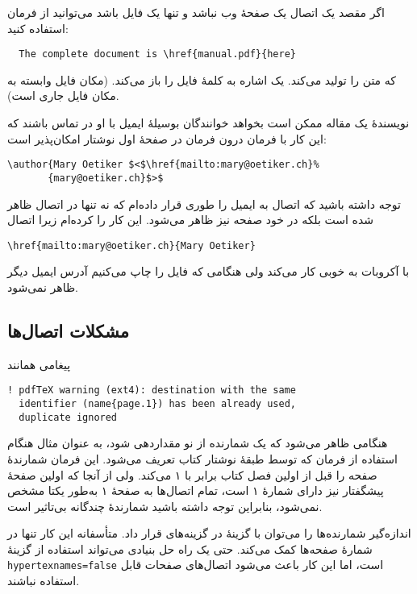 اگر مقصد یک اتصال یک صفحهٔ وب نباشد و تنها یک فایل باشد می‌توانید از فرمان   استفاده کنید: 

\setLR
\begin{verbatim}
  The complete document is \href{manual.pdf}{here}
\end{verbatim}
\setRL

که متن 
 را تولید می‌کند.
یک اشاره به کلمهٔ 
  فایل   را باز می‌کند. 
(مکان فایل وابسته به مکان فایل جاری است).

نویسندهٔ یک مقاله ممکن است بخواهد خوانندگان بوسیلهٔ ایمیل با او در تماس باشند که این کار با فرمان  درون فرمان  در صفحهٔ اول نوشتار‌ امکان‌پذیر است:

\setLR
\begin{code}
\begin{verbatim}
\author{Mary Oetiker $<$\href{mailto:mary@oetiker.ch}%
       {mary@oetiker.ch}$>$
\end{verbatim}
\end{code}
\setRL

توجه داشته باشید که اتصال به ایمیل را طوری قرار داده‌ام که نه تنها در اتصال ظاهر شده است بلکه در خود صفحه نیز ظاهر می‌شود. این کار را کرده‌ام زیرا اتصال

\setLR
\verb+\href{mailto:mary@oetiker.ch}{Mary Oetiker}+\\
\setRL

با آکروبات به خوبی کار می‌کند ولی هنگامی که فایل را چاپ می‌کنیم آدرس ایمیل دیگر ظاهر نمی‌شود.

\subsection{مشکلات اتصال‌ها}
پیغامی همانند 

\setLR
\begin{verbatim}
! pdfTeX warning (ext4): destination with the same
  identifier (name{page.1}) has been already used,
  duplicate ignored
\end{verbatim}
\setRL

هنگامی ظاهر می‌شود که یک شمارنده از نو مقداردهی شود، به عنوان مثال هنگام استفاده از فرمان   که توسط طبقهٔ نوشتار کتاب تعریف می‌شود. این فرمان شمارندهٔ صفحه را قبل از اولین فصل کتاب برابر با ۱ می‌کند. ولی از آنجا که اولین صفحهٔ پیشگفتار نیز دارای شمارهٔ ۱ است، تمام اتصال‌ها به صفحهٔ ۱ به‌طور یکتا مشخص نمی‌شود،   بنابراین توجه داشته باشید شمارندهٔ چندگانه بی‌تاثیر است.

اندازه‌گیر شمارنده‌ها را می‌توان با گزینهٔ  در گزینه‌های  قرار داد. متأسفانه این کار تنها در شمارهٔ صفحه‌ها کمک می‌کند.
حتی یک راه حل بنیادی می‌تواند استفاده از گزینهٔ \texttt{hypertexnames=false} است، اما این کار باعث می‌شود اتصال‌های صفحات قابل استفاده نباشند.


